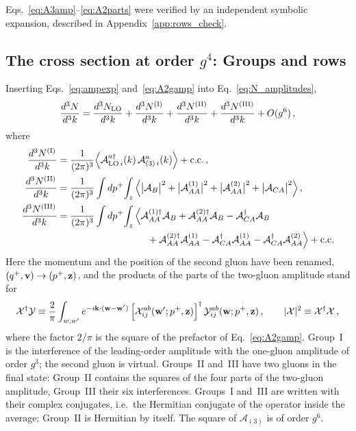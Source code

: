 Eqs.~\eqref{eq:A3amp}--\eqref{eq:A2parts} were verified by an independent symbolic expansion, described in Appendix~\ref{app:rows_check}.

\subsection{The cross section at order \texorpdfstring{$g^4$}{g4}: Groups and rows}\label{sec:groups}

Inserting Eqs.~\eqref{eq:ampexp} and~\eqref{eq:A2gamp} into Eq.~\eqref{eq:N_amplitudes},
\begin{align}\label{eq:NLOdecomp}
\frac{d^3N}{d^3k}=\frac{d^3N_{\rm LO}}{d^3k}+\frac{d^3N^{\rm(I)}}{d^3k}+\frac{d^3N^{\rm(II)}}{d^3k}+\frac{d^3N^{\rm(III)}}{d^3k}+O(g^6)\,,
\end{align}
where
\begin{align}\label{eq:Groups}
\frac{d^3N^{\rm(I)}}{d^3k}&=\frac{1}{(2\pi)^3}\Big\langle\mathcal A^{a\dagger}_{{\rm LO}\,i}(k)\,\mathcal A^a_{(3)\,i}(k)\Big\rangle+{\rm c.c.}\,,\notag\\
\frac{d^3N^{\rm(II)}}{d^3k}&=\frac{1}{(2\pi)^3}\int dp^+\!\int_z\Big\langle\big|\mathcal A_B\big|^2+\big|\mathcal A^{(1)}_{AA}\big|^2+\big|\mathcal A^{(2)}_{AA}\big|^2+\big|\mathcal A_{CA}\big|^2\Big\rangle\,,\notag\\
\frac{d^3N^{\rm(III)}}{d^3k}&=\frac{1}{(2\pi)^3}\int dp^+\!\int_z\Big\langle\mathcal A^{(1)\dagger}_{AA}\mathcal A_B+\mathcal A^{(2)\dagger}_{AA}\mathcal A_B-\mathcal A^{\dagger}_{CA}\mathcal A_B
\notag\\&\hspace{3.3cm}+\mathcal A^{(2)\dagger}_{AA}\mathcal A^{(1)}_{AA}-\mathcal A^{\dagger}_{CA}\mathcal A^{(1)}_{AA}-\mathcal A^{\dagger}_{CA}\mathcal A^{(2)}_{AA}\Big\rangle+{\rm c.c.}
\end{align}
Here the momentum and the position of the second gluon have been renamed, $(q^+,\mathbf{v})\to(p^+,\mathbf{z})$, and the products of the parts of the two-gluon amplitude stand for
\begin{align}\label{eq:XYdef}
\mathcal X^\dagger\mathcal Y\equiv\frac{2}{\pi}\int_{w,w'}e^{-i\mathbf{k}\cdot(\mathbf{w}-\mathbf{w}')}\,\Big[\mathcal X^{ab}_{ij}(\mathbf{w}';p^+,\mathbf{z})\Big]^\dagger\,\mathcal Y^{ab}_{ij}(\mathbf{w};p^+,\mathbf{z})\,,\qquad|\mathcal X|^2\equiv\mathcal X^\dagger\mathcal X\,,
\end{align}
where the factor $2/\pi$ is the square of the prefactor of Eq.~\eqref{eq:A2gamp}. Group~I is the interference of the leading-order amplitude with the one-gluon amplitude of order $g^3$; the second gluon is virtual. Groups~II and~III have two gluons in the final state: Group~II contains the squares of the four parts of the two-gluon amplitude, Group~III their six interferences. Groups~I and~III are written with their complex conjugates, i.e.\ the Hermitian conjugate of the operator inside the average; Group~II is Hermitian by itself. The square of $\mathcal A_{(3)}$ is of order $g^6$.

